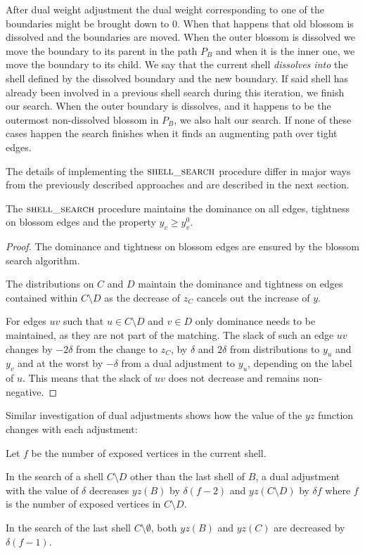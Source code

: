 After dual weight adjustment the dual weight corresponding to one of the boundaries might be brought down to $0$. When that happens that old blossom is dissolved and the boundaries are moved. When the outer blossom is dissolved we move the boundary to its parent in the path $P_B$ and when it is the inner one, we move the boundary to its child. We say that the current shell \textit{dissolves into} the shell defined by the dissolved boundary and the new boundary. If said shell has already been involved in a previous shell search during this iteration, we finish our search. When the outer boundary is dissolves, and it happens to be the outermost non-dissolved blossom in $P_B$, we also halt our search. If none of these cases happen the search finishes when it finds an augmenting path over tight edges.

The details of implementing the $\textsc{shell\_search}$ procedure differ in major ways from the previously described approaches and are described in the next section.

\begin{lemma}\label{lem:search_correctness}
    The $\textsc{shell\_search}$ procedure maintains the dominance on all edges, tightness on blossom edges and the property $y_v \geq y^0_v$.
\end{lemma}

\begin{proof}
    The dominance and tightness on blossom edges are ensured by the blossom search algorithm. 
    
    The distributions on $C$ and $D$ maintain the dominance and tightness on edges contained within $C \setminus D$ as the decrease of $z_C$ cancels out the increase of $y$. 
    
    For edges $uv$ such that $u \in C \setminus D$ and $v \in D$ only dominance needs to be maintained, as they are not part of the matching. The slack of such an edge $uv$ changes by $-2\delta$ from the change to $z_C$, by $\delta$ and $2\delta$ from distributions to $y_u$ and $y_v$ and at the worst by $-\delta$ from a dual adjustment to $y_u$, depending on the label of $u$. This means that the slack of $uv$ does not decrease and remains non-negative.
\end{proof}

Similar investigation of dual adjustments shows how the value of the $yz$ function changes with each adjustment:

\begin{lemma}\label{lem:search_duals}
    Let $f$ be the number of exposed vertices in the current shell. 
    
    In the search of a shell $C \setminus D$ other than the last shell of $B$, a dual adjustment with the value of $\delta$ decreases $yz(B)$ by $\delta(f-2)$ and $yz(C \setminus D)$ by $\delta f$ where $f$ is the number of exposed vertices in $C \setminus D$. 
    
    In the search of the last shell $C \setminus \emptyset$, both $yz(B)$ and $yz(C)$ are decreased by $\delta(f-1)$.
\end{lemma}

